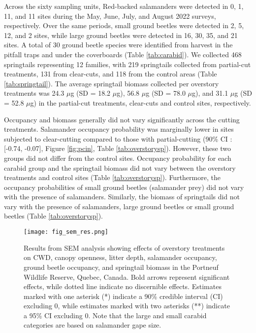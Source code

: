 \vspace{10pt}

Across the sixty sampling units, Red-backed salamanders were detected in 0, 1, 11, and 11 sites during the May, June, July, and August 2022 surveys, respectively. 
Over the same periods, small ground beetles were detected in 2, 5, 12, and 2 sites, while large ground beetles were detected in 16, 30, 35, and 21 sites.
A total of 30 ground beetle species were identified from harvest in the pitfall traps and under the coverboards (Table \ref{tab:carabid}). 
We collected 468 springtails representing 12 families, with 219 springtails collected from partial-cut treatments, 131 from clear-cuts, and 118 from the control areas (Table \ref{tab:springtail}). 
The average springtail biomass collected per overstory treatments was 24.3 $\mu$g (SD = 18.2 $\mu$g), 56.8 $\mu$g (SD = 78.0 $\mu$g), and 31.1 $\mu$g (SD = 52.8 $\mu$g) in the partial-cut treatments, clear-cuts and control sites, respectively.

Occupancy and biomass generally did not vary significantly across the cutting treatments. 
Salamander occupancy probability was marginally lower in sites subjected to clear-cutting compared to those with partial-cutting (90\% CI : [-0.74, -0.07], Figure \ref{fig:pcin}, Table \ref{tab:overstorysp}). 
However, these two groups did not differ from the control sites. 
Occupancy probability for each carabid group and the springtail biomass did not vary between the overstory treatments and control sites (Table \ref{tab:overstorysp}). 
Furthermore, the occupancy probabilities of small ground beetles (salamander prey) did not vary with the presence of salamanders. 
Similarly, the biomass of springtails did not vary with the presence of salamanders, large ground beetles or small ground beetles (Table \ref{tab:overstorysp}).

\begin{figure}[h!]
	\centering
	\texttt{[image: fig\_sem\_res.png]}
	\caption[Results from structural equation modeling analysis revealing effects of overstory treatments on coarse woody debris volume,
  canopy openness, litter depth, salamander occupancy, ground beetle occupancy, and springtail biomass.]
  {Results from SEM analysis showing effects of overstory treatments on CWD, 
  canopy openness, litter depth, salamander occupancy, ground beetle occupancy, and springtail biomass in the Portneuf Wildlife Reserve, 
  Quebec, Canada. Bold arrows represent significant effects, while dotted line indicate no discernible effects. 
  Estimates marked with one asterisk (*) indicate a 90\% credible interval (CI) excluding 0, while estimates marked with two asterisks (**) indicate a 95\% CI excluding 0. 
  Note that the large and small carabid categories are based on salamander gape size.}
	\label{fig:SEMres}
\end{figure}  

